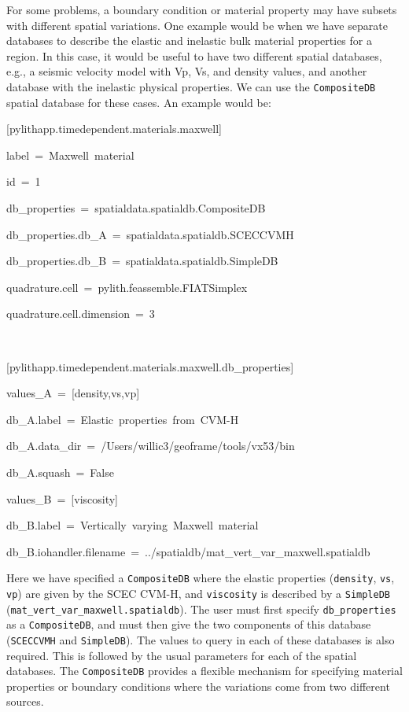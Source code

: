 For some problems, a boundary condition or material property may have
subsets with different spatial variations. One example would be when
we have separate databases to describe the elastic and inelastic bulk
material properties for a region. In this case, it would be useful
to have two different spatial databases, e.g., a seismic velocity
model with Vp, Vs, and density values, and another database with the
inelastic physical properties. We can use the \texttt{CompositeDB}
spatial database for these cases. An example would be:
\begin{lyxcode}
{[}pylithapp.timedependent.materials.maxwell{]}

label~=~Maxwell~material

id~=~1

db\_properties~=~spatialdata.spatialdb.CompositeDB

db\_properties.db\_A~=~spatialdata.spatialdb.SCECCVMH

db\_properties.db\_B~=~spatialdata.spatialdb.SimpleDB

quadrature.cell~=~pylith.feassemble.FIATSimplex

quadrature.cell.dimension~=~3

~

{[}pylithapp.timedependent.materials.maxwell.db\_properties{]}

values\_A~=~{[}density,vs,vp{]}

db\_A.label~=~Elastic~properties~from~CVM-H

db\_A.data\_dir~=~/Users/willic3/geoframe/tools/vx53/bin

db\_A.squash~=~False

values\_B~=~{[}viscosity{]}

db\_B.label~=~Vertically~varying~Maxwell~material

db\_B.iohandler.filename~=~../spatialdb/mat\_vert\_var\_maxwell.spatialdb
\end{lyxcode}
Here we have specified a \texttt{CompositeDB} where the elastic properties
(\texttt{density}, \texttt{vs}, \texttt{vp}) are given by the SCEC
CVM-H, and \texttt{viscosity} is described by a \texttt{SimpleDB}
(\texttt{mat\_vert\_var\_maxwell.spatialdb}). The user must first
specify \texttt{db\_properties} as a \texttt{CompositeDB}, and must
then give the two components of this database (\texttt{SCECCVMH} and
\texttt{SimpleDB}). The values to query in each of these databases
is also required. This is followed by the usual parameters for each
of the spatial databases. The \texttt{CompositeDB} provides a flexible
mechanism for specifying material properties or boundary conditions
where the variations come from two different sources.



